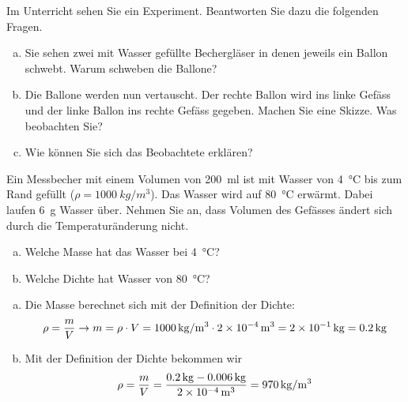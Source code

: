 
\begin{aufgabe}
	Im Unterricht sehen Sie ein Experiment.
	Beantworten Sie dazu die folgenden Fragen.
\begin{enumerate} [a)]
	\item Sie sehen zwei mit Wasser gefüllte Bechergläser in denen jeweils ein Ballon schwebt.
	Warum schweben die Ballone?
\item Die Ballone werden nun vertauscht. Der rechte Ballon wird ins linke Gefäss und der linke Ballon ins rechte Gefäss gegeben.
	Machen Sie eine Skizze. Was beobachten Sie?
\item Wie können Sie sich das Beobachtete erklären?
\end{enumerate}
\end{aufgabe}



\begin{aufgabe}
	Ein Messbecher mit einem Volumen von \SI{200}{ml} 
	ist mit Wasser von \SI{4}{\celsius} bis zum Rand gefüllt ($\rho=\SI{1000}{kg/m^3}$).
	Das Wasser wird auf \SI{80}{\celsius} erwärmt. Dabei laufen \SI{6}{g} Wasser über.
	Nehmen Sie an, dass Volumen des Gefässes ändert sich durch die Temperaturänderung nicht.
	\begin{enumerate} [a)]
		\item Welche Masse hat das Wasser bei \SI{4}{\celsius}?
		\item Welche Dichte hat Wasser von \SI{80}{\celsius}?
	\end{enumerate}
	

	\begin{loesung}
		\begin{enumerate}[a)]
			\item Die Masse berechnet sich mit der Definition der Dichte:
				\begin{eqnarray*}
					\rho =\frac{m}{V}\to m=\rho\cdot V=\SI{1000}{kg/m^3}\cdot\SI{2E-4}{m^3}=\SI{2E-1}{kg}=\SI{0.2}{kg}
				\end{eqnarray*}
			\item Mit der Definition der Dichte bekommen wir
				\begin{eqnarray*}
					\rho =\frac{m}{V}=\frac{\SI{0.2}{kg}-\SI{0.006}{kg}}{\SI{2E-4}{m^3}}=\SI{970}{kg/m^3}
				\end{eqnarray*}
		\end{enumerate}
	\end{loesung}

\end{aufgabe}



